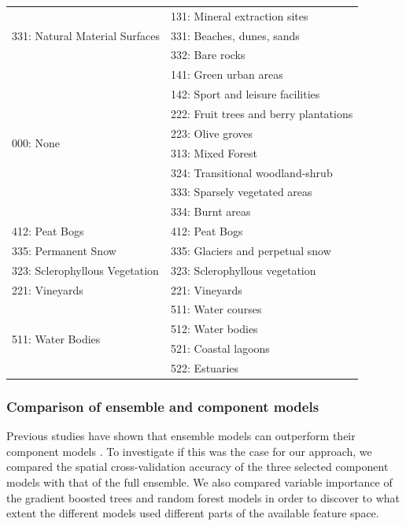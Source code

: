 \begin{table}[!hbt]
\begin{tabular}{@{}ll@{}}
        \multirow{3}{*}{331: Natural Material Surfaces} & 131: Mineral extraction sites \\
         & 331: Beaches, dunes, sands \\
         & 332: Bare rocks \\ \midrule
        \multirow{8}{*}{000: None} & 141: Green urban areas \\
         & 142: Sport and leisure facilities \\
         & 222: Fruit trees and berry plantations \\
         & 223: Olive groves \\
         & 313: Mixed Forest \\
         & 324: Transitional woodland-shrub \\
         & 333: Sparsely vegetated areas \\
         & 334: Burnt areas \\ \midrule
        412: Peat Bogs & 412: Peat Bogs \\ \midrule
        335: Permanent Snow & 335: Glaciers and perpetual snow \\ \midrule
        323: Sclerophyllous Vegetation & 323: Sclerophyllous vegetation \\ \midrule
        221: Vineyards & 221: Vineyards \\ \midrule
        \multirow{4}{*}{511: Water Bodies} & 511: Water courses \\
         & 512: Water bodies \\
         & 521: Coastal lagoons \\
         & 522: Estuaries \\ \bottomrule
        \end{tabular}%
        \end{table}
     
    
    \subsubsection*{Comparison of ensemble and component models}
        
        Previous studies have shown that ensemble models can outperform their component models \citep{seni2010ensemble,zhang2012ensemble}. To investigate if this was the case for our approach, we compared the spatial cross-validation accuracy of the three selected component models with that of the full ensemble. We also compared variable importance of the gradient boosted trees and random forest models in order to discover to what extent the different models used different parts of the available feature space.
        
